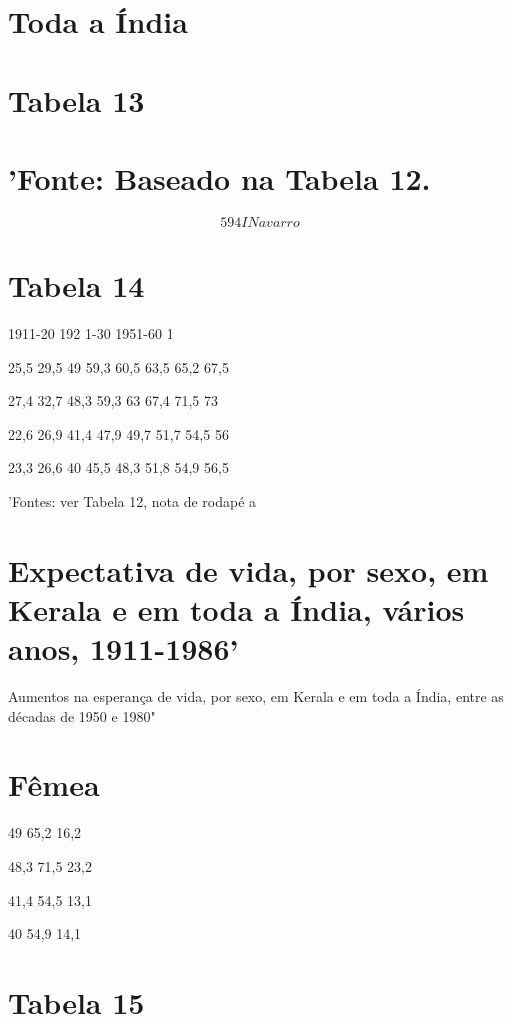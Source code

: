 {{{\section{Toda a Índia}
 \par 
\section{Tabela 13}
 \par 
\section{'Fonte: Baseado na Tabela 12.}
 \par 
\[594 I Navarro\]
 \par 
\section{Tabela 14}
 \par 
1911-20 {\color{blue}192} 1-30 1951-60 1%
 \par 
25,5 29,5 {\color{blue}49} 59,3 60,5 63,5 65,2 67,5
 \par 
27,4 32,7 48,3 59,3 {\color{blue}63} 67,4 71,5 {\color{blue}73}
 \par 
22,6 26,9 41,4 47,9 49,7 51,7 54,5 {\color{blue}56}
 \par 
23,3 26,6 {\color{blue}40} 45,5 48,3 51,8 54,9 56,5
 \par 
'Fontes: ver Tabela 12, nota de rodapé a
 \par 
\section{Expectativa de vida, por sexo, em Kerala e em toda a Índia, vários anos, 1911-1986'}
 \par 
Aumentos na esperança de vida, por sexo, em Kerala e em toda a Índia, entre as décadas de 1950 e 1980"
 \par 
\section{Fêmea}
 \par 
49 65,2 16,2
 \par 
48,3 71,5 23,2
 \par 
41,4 54,5 13,1
 \par 
40 54,9 14,1
 \par 
\section{Tabela 15}
 \par 
}}}
